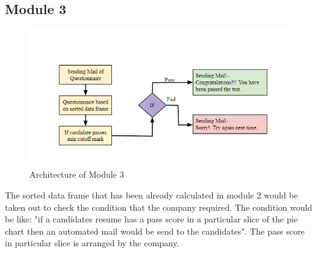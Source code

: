 \documentclass[12 pt, oneside]{book}
\begin{document}
\subsection{Module 3}
\begin{figure}[h]
	\begin{center}
		\includegraphics[width = 13 cm]{m3.png}
		\caption{Architecture of Module 3}
		\label{ab}
	\end{center}
\end{figure}

\bigskip
The sorted data frame that has been already calculated in module 2 would be taken out to check the condition that the company required. The condition would be like: "if a candidates resume has a pass score in a particular slice of the pie chart then an automated mail would be send to the candidates". The pass score in particular slice is arranged by the company.

\bigskip\bigskip
\bigskip\bigskip
\bigskip\bigskip
\bigskip


    
\bigskip
\end{document}
